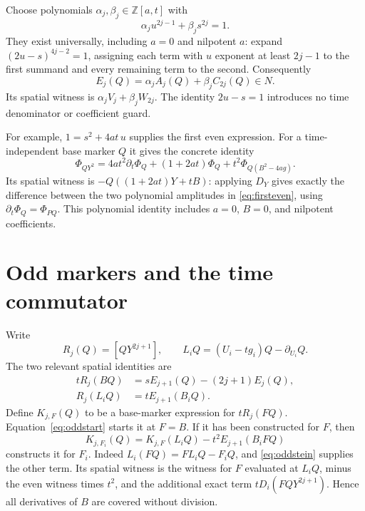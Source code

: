 \documentclass[11pt]{article}
\theoremstyle{definition}\newtheorem{definition}[theorem]{Definition}
\theoremstyle{remark}\newtheorem{remark}[theorem]{Remark}
\begin{document}
Choose polynomials $\alpha_j,\beta_j\in\mathbb Z[a,t]$ with
\[
 \alpha_j u^{2j-1}+\beta_j s^{2j}=1.
\]
They exist universally, including $a=0$ and nilpotent $a$:
expand $(2u-s)^{4j-2}=1$, assigning each term with $u$ exponent
at least $2j-1$ to the first summand and every remaining term
to the second. Consequently
\begin{equation}\label{eq:evenpacket}
 E_j(Q)=\alpha_j A_j(Q)+\beta_j C_{2j}(Q)\in N.
\end{equation}
Its spatial witness is $\alpha_jV_j+\beta_jW_{2j}$.
The identity $2u-s=1$ introduces no time denominator or coefficient guard.

For example, $1=s^2+4at\,u$ supplies the first even expression.
For a time-independent base marker $Q$ it gives the concrete identity
\begin{equation}\label{eq:firsteven}
 \Phi_{QY^2}
 =4at^2\partial_t\Phi_Q+(1+2at)\Phi_Q
       +t^2\Phi_{Q(B^2-4ag)}.
\end{equation}
Its spatial witness is $-Q((1+2at)Y+tB)$: applying $D_Y$ gives
exactly the difference between the two polynomial amplitudes in
\eqref{eq:firsteven}, using $\partial_t\Phi_Q=\Phi_{PQ}$.
This polynomial identity includes $a=0$, $B=0$, and nilpotent coefficients.

\section{Odd markers and the time commutator}

Write
\[
 R_j(Q)=[QY^{2j+1}],\qquad
 L_iQ=(U_i-tg_i)Q-\partial_{U_i}Q.
\]
The two relevant spatial identities are
\begin{align}
 tR_j(BQ)&=sE_{j+1}(Q)-(2j+1)E_j(Q),\label{eq:oddstart}\\
 R_j(L_iQ)&=tE_{j+1}(B_iQ).\label{eq:oddstein}
\end{align}
Define $K_{j,F}(Q)$ to be a base-marker expression for
$tR_j(FQ)$. Equation~\eqref{eq:oddstart} starts it at $F=B$.
If it has been constructed for $F$, then
\begin{equation}\label{eq:source-derivative}
 K_{j,F_i}(Q)=K_{j,F}(L_iQ)
                          -t^2E_{j+1}(B_iFQ)
\end{equation}
constructs it for $F_i$. Indeed
$L_i(FQ)=FL_iQ-F_iQ$, and \eqref{eq:oddstein} supplies
the other term. Its spatial witness is the witness for $F$ evaluated at $L_iQ$,
minus the even witness times $t^2$, and the additional exact term
$tD_i(FQY^{2j+1})$. Hence all derivatives of $B$ are covered
without division.
\end{document}
